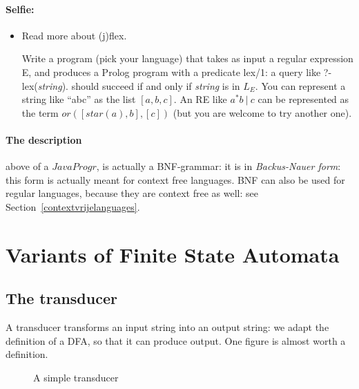 \paragraph{Selfie:}
\begin{itemize}
\item[]
Read more about (j)flex.

Write a program (pick your language) that takes as input a regular
expression E, and produces a Prolog program with a predicate lex/1: a
query like ?- lex({\em string}). should succeed if and only if {\em
  string} is in $L_E$. You can represent a string like ``abc'' as the
list $[a,b,c]$. An RE like $a^*b~|~c$ can be represented as the term
$or([star(a),b],[c])$ (but you are welcome to try another one).
\end{itemize}

\paragraph{The description} above of a $JavaProgr$, is actually a
BNF-grammar: it is in {\em Backus-Nauer form}: this form is actually
meant for context free languages. BNF can also be used for regular
languages, because they are context free as well: see
Section~\ref{contextvrijelanguages}.

\newpage
\section{Variants of Finite State Automata}

\subsection{The transducer}


A transducer transforms an input string into an output string: we
adapt the definition of a DFA, so that it can produce output. One
figure is almost worth a definition.

\begin{figure}[h]
\caption{A simple transducer \label{trans1}}
\end{figure}

